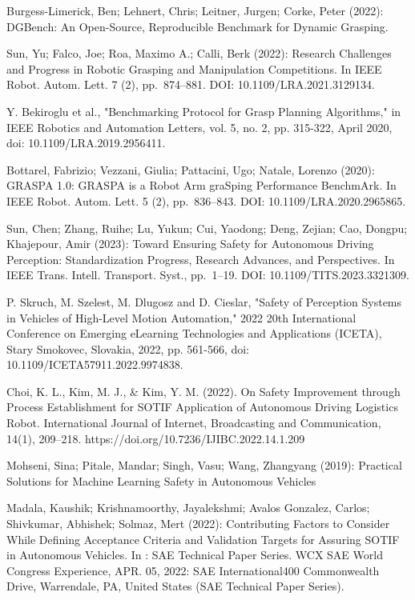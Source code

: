 \begin{thebibliography}{99}
 Burgess-Limerick, Ben; Lehnert, Chris; Leitner, Jurgen; Corke, Peter (2022): DGBench: An Open-Source, Reproducible Benchmark for Dynamic Grasping.

 Sun, Yu; Falco, Joe; Roa, Maximo A.; Calli, Berk (2022): Research Challenges and Progress in Robotic Grasping and Manipulation Competitions. In IEEE Robot. Autom. Lett. 7 (2), pp. 874–881. DOI: 10.1109/LRA.2021.3129134.

 Y. Bekiroglu et al., "Benchmarking Protocol for Grasp Planning Algorithms," in IEEE Robotics and Automation Letters, vol. 5, no. 2, pp. 315-322, April 2020, doi: 10.1109/LRA.2019.2956411.

 Bottarel, Fabrizio; Vezzani, Giulia; Pattacini, Ugo; Natale, Lorenzo (2020): GRASPA 1.0: GRASPA is a Robot Arm graSping Performance BenchmArk. In IEEE Robot. Autom. Lett. 5 (2), pp. 836–843. DOI: 10.1109/LRA.2020.2965865.

 Sun, Chen; Zhang, Ruihe; Lu, Yukun; Cui, Yaodong; Deng, Zejian; Cao, Dongpu; Khajepour, Amir (2023): Toward Ensuring Safety for Autonomous Driving Perception: Standardization Progress, Research Advances, and Perspectives. In IEEE Trans. Intell. Transport. Syst., pp. 1–19. DOI: 10.1109/TITS.2023.3321309.

P. Skruch, M. Szelest, M. Dlugosz and D. Cieslar, "Safety of Perception Systems in Vehicles of High-Level Motion Automation," 2022 20th International Conference on Emerging eLearning Technologies and Applications (ICETA), Stary Smokovec, Slovakia, 2022, pp. 561-566, doi: 10.1109/ICETA57911.2022.9974838.

 Choi, K. L., Kim, M. J., & Kim, Y. M. (2022). On Safety Improvement through Process Establishment for SOTIF Application of Autonomous Driving Logistics Robot. International Journal of Internet, Broadcasting and Communication, 14(1), 209–218. https://doi.org/10.7236/IJIBC.2022.14.1.209

 Mohseni, Sina; Pitale, Mandar; Singh, Vasu; Wang, Zhangyang (2019): Practical Solutions for Machine Learning Safety in Autonomous Vehicles

 Madala, Kaushik; Krishnamoorthy, Jayalekshmi; Avalos Gonzalez, Carlos; Shivkumar, Abhishek; Solmaz, Mert (2022): Contributing Factors to Consider While Defining Acceptance Criteria and Validation Targets for Assuring SOTIF in Autonomous Vehicles. In : SAE Technical Paper Series. WCX SAE World Congress Experience, APR. 05, 2022: SAE International400 Commonwealth Drive, Warrendale, PA, United States (SAE Technical Paper Series).


\end{thebibliography}

